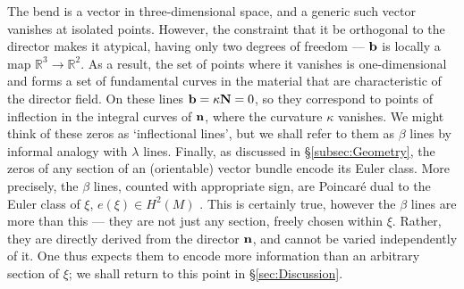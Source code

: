 The bend is a vector in three-dimensional space, and a generic such vector vanishes at isolated points. However, the constraint that it be orthogonal to the director makes it atypical, having only two degrees of freedom --- $\mathbf{b}$ is locally a map $\mathbb{R}^3 \rightarrow \mathbb{R}^2$. As a result, the set of points where it vanishes is one-dimensional and forms a set of fundamental curves in the material that are characteristic of the director field. On these lines $\mathbf{b} = \kappa \mathbf{N} = 0$, so they correspond to points of inflection in the integral curves of ${\bf n}$, where the curvature $\kappa$ vanishes. We might think of these zeros as `inflectional lines', but we shall refer to them as $\beta$ lines by informal analogy with $\lambda$ lines. Finally, as discussed in \S\ref{subsec:Geometry}, the zeros of any section of an (orientable) vector bundle encode its Euler class. More precisely, the $\beta$ lines, counted with appropriate sign, are Poincar\'e dual to the Euler class of $\xi$, $e(\xi) \in H^2(M)$ \citep{BottTuBook,Hatcher2012, Geiges2009}. This is certainly true, however the $\beta$ lines are more than this --- they are not just any section, freely chosen within $\xi$. Rather, they are directly derived from the director $\mathbf{n}$, and cannot be varied independently of it. One thus expects them to encode more information than an arbitrary section of $\xi$; we shall return to this point in \S\ref{sec:Discussion}. 

